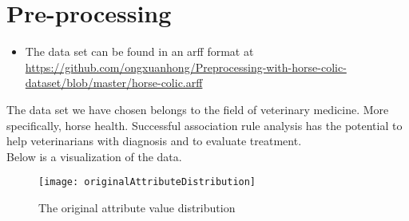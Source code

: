 \section{Pre-processing}

\begin{itemize}
\item The data set can be found in an arff format at \\ \href{github.com/ongxuanhong/Preprocessing-with-horse-colic-dataset/blob/master/horse-colic.arff}{https://github.com/ongxuanhong/Preprocessing-with-horse-colic-dataset/blob/master/horse-colic.arff}
\end{itemize}
The data set we have chosen belongs to the field of veterinary medicine. More specifically, horse health. Successful association rule analysis has the potential to help veterinarians with diagnosis and  to evaluate treatment.\\
Below is a visualization of the data.
\begin{figure}[h!]
\centering
\texttt{[image: originalAttributeDistribution]}
\caption{The original attribute value distribution}
\end{figure}
 

